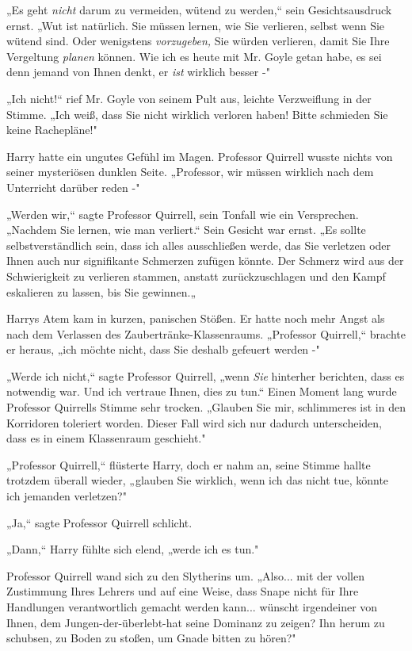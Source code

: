 {„Es geht \emph{nicht} darum zu vermeiden, wütend zu werden,“ sein Gesichtsausdruck ernst. „Wut ist natürlich. Sie müssen lernen, wie Sie verlieren, selbst wenn Sie wütend sind. Oder wenigstens \emph{vorzugeben,} Sie würden verlieren, damit Sie Ihre Vergeltung \emph{planen} können. Wie ich es heute mit Mr. Goyle getan habe, es sei denn jemand von Ihnen denkt, er \emph{ist} wirklich besser -"

„Ich nicht!“ rief Mr. Goyle von seinem Pult aus, leichte Verzweiflung in der Stimme. „Ich weiß, dass Sie nicht wirklich verloren haben! Bitte schmieden Sie keine Rachepläne!"

Harry hatte ein ungutes Gefühl im Magen. Professor Quirrell wusste nichts von seiner mysteriösen dunklen Seite. „Professor, wir müssen wirklich nach dem Unterricht darüber reden -"

„Werden wir,“ sagte Professor Quirrell, sein Tonfall wie ein Versprechen. „Nachdem Sie lernen, wie man verliert.“ Sein Gesicht war ernst. „Es sollte selbstverständlich sein, dass ich alles ausschließen werde, das Sie verletzen oder Ihnen auch nur signifikante Schmerzen zufügen könnte. Der Schmerz wird aus der Schwierigkeit zu verlieren stammen, anstatt zurückzuschlagen und den Kampf eskalieren zu lassen, bis Sie gewinnen.„

Harrys Atem kam in kurzen, panischen Stößen. Er hatte noch mehr Angst als nach dem Verlassen des Zaubertränke-Klassenraums. „Professor Quirrell,“ brachte er heraus, „ich möchte nicht, dass Sie deshalb gefeuert werden -"

„Werde ich nicht,“ sagte Professor Quirrell, „wenn \emph{Sie} hinterher berichten, dass es notwendig war. Und ich vertraue Ihnen, dies zu tun.“ Einen Moment lang wurde Professor Quirrells Stimme sehr trocken. „Glauben Sie mir, schlimmeres ist in den Korridoren toleriert worden. Dieser Fall wird sich nur dadurch unterscheiden, dass es in einem Klassenraum geschieht."

„Professor Quirrell,“ flüsterte Harry, doch er nahm an, seine Stimme hallte trotzdem überall wieder, „glauben Sie wirklich, wenn ich das nicht tue, könnte ich jemanden verletzen?"

„Ja,“ sagte Professor Quirrell schlicht.

„Dann,“ Harry fühlte sich elend, „werde ich es tun."

Professor Quirrell wand sich zu den Slytherins um. „Also... mit der vollen Zustimmung Ihres Lehrers und auf eine Weise, dass Snape nicht für Ihre Handlungen verantwortlich gemacht werden kann... wünscht irgendeiner von Ihnen, dem Jungen-der-überlebt-hat seine Dominanz zu zeigen? Ihn herum zu schubsen, zu Boden zu stoßen, um Gnade bitten zu hören?"

}
